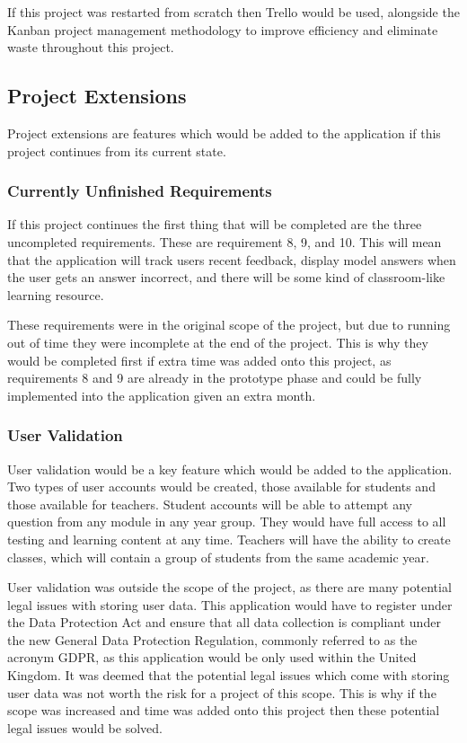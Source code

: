 \documentclass{article}
\begin{document}
If this project was restarted from scratch then Trello would be used, alongside the Kanban project management methodology to improve efficiency and eliminate waste throughout this project. \par

\subsection{Project Extensions}

Project extensions are features which would be added to the application if this project continues from its current state. 

\subsubsection{Currently Unfinished Requirements}

If this project continues the first thing that will be completed are the three uncompleted requirements. These are requirement 8, 9, and 10. This will mean that the application will track users recent feedback, display model answers when the user gets an answer incorrect, and there will be some kind of classroom-like learning resource. \par

These requirements were in the original scope of the project, but due to running out of time they were incomplete at the end of the project. This is why they would be completed first if extra time was added onto this project, as requirements 8 and 9 are already in the prototype phase and could be fully implemented into the application given an extra month. 

\subsubsection{User Validation}

User validation would be a key feature which would be added to the application. Two types of user accounts would be created, those available for students and those available for teachers. Student accounts will be able to attempt any question from any module in any year group. They would have full access to all testing and learning content at any time. Teachers will have the ability to create classes, which will contain a group of students from the same academic year. \par

User validation was outside the scope of the project, as there are many potential legal issues with storing user data. This application would have to register under the Data Protection Act and ensure that all data collection is compliant under the new General Data Protection Regulation, commonly referred to as the acronym GDPR, as this application would be only used within the United Kingdom. It was deemed that the potential legal issues which come with storing user data was not worth the risk for a project of this scope. This is why if the scope was increased and time was added onto this project then these potential legal issues would be solved. \par
\end{document}
